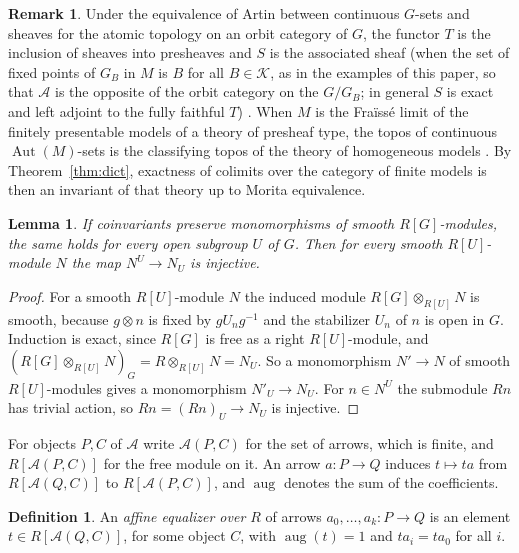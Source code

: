 \documentclass[11pt,a4paper]{article}
\newtheorem{lemma}[theorem]{Lemma}
\theoremstyle{definition}
\newtheorem{definition}[theorem]{Definition}
\newtheorem{remark}[theorem]{Remark}
\newcommand{\A}{\mathcal{A}}
\newcommand{\K}{\mathcal{K}}
\newcommand{\aug}{\operatorname{aug}}
\newcommand{\Aut}{\operatorname{Aut}}
\begin{document}
\begin{remark}\label{rem:topos}
Under the equivalence of Artin between continuous $G$-sets and sheaves for
the atomic topology on an orbit category of $G$, the functor $T$ is the
inclusion of sheaves into presheaves and $S$ is the associated sheaf (when the set of fixed points of $G_B$ in $M$ is $B$ for all $B\in\K$, as in the examples of this paper, so that $\A$ is the opposite of the orbit category on the $G/G_B$; in general $S$ is exact and left adjoint to the fully faithful $T$) \cite[Theorem~5.1 and the equivalence displayed after it]{DLLX}. When $M$ is
the Fra\"iss\'e limit of the finitely presentable models of a theory of
presheaf type, the topos of continuous $\Aut(M)$-sets is the classifying
topos of the theory of homogeneous models
\cite[Theorem~2.9, Proposition~2.10]{Ca}. By Theorem~\ref{thm:dict},
exactness of colimits over the category of finite models is then an
invariant of that theory up to Morita equivalence.
\end{remark}

\begin{lemma}\label{lem:open}
If coinvariants preserve monomorphisms of smooth $R[G]$-modules, the same
holds for every open subgroup $U$ of $G$. Then for every smooth
$R[U]$-module $N$ the map $N^U\to N_U$ is injective.
\end{lemma}

\begin{proof}
For a smooth $R[U]$-module $N$ the induced module $R[G]\otimes_{R[U]}N$ is
smooth, because $g\otimes n$ is fixed by $gU_ng^{-1}$ and the stabilizer
$U_n$ of $n$ is open in $G$. Induction is exact, since $R[G]$ is free as a
right $R[U]$-module, and
$(R[G]\otimes_{R[U]}N)_G=R\otimes_{R[U]}N=N_U$. So a monomorphism
$N'\to N$ of smooth $R[U]$-modules gives a monomorphism $N'_U\to N_U$. For
$n\in N^U$ the submodule $Rn$ has trivial action, so $Rn=(Rn)_U\to N_U$ is
injective.
\end{proof}

For objects $P,C$ of $\A$ write $\A(P,C)$ for the set of arrows, which is
finite, and $R[\A(P,C)]$ for the free module on it. An arrow
$a\colon P\to Q$ induces $t\mapsto ta$ from $R[\A(Q,C)]$ to $R[\A(P,C)]$,
and $\aug$ denotes the sum of the coefficients.

\begin{definition}\label{def:affine}
An \emph{affine equalizer over $R$} of arrows $a_0,\dots,a_k\colon P\to Q$ is
an element $t\in R[\A(Q,C)]$, for some object $C$, with $\aug(t)=1$ and
$ta_i=ta_0$ for all $i$.
\end{definition}
\end{document}
